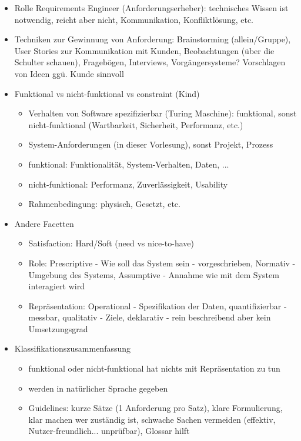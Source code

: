 \documentclass[paper=a4, fontsize=11pt]{scrartcl} %
\numberwithin{equation}{section} %
\numberwithin{figure}{section} %
\numberwithin{table}{section} %
\begin{document}
\begin{itemize}
  \item Rolle Requirements Engineer (Anforderungserheber): technisches Wissen ist notwendig, reicht aber nicht, Kommunikation, Konfliktlösung, etc.
  \item Techniken zur Gewinnung von Anforderung: Brainstorming (allein/Gruppe), User Stories zur Kommunikation mit Kunden, Beobachtungen (über die Schulter schauen), Fragebögen, Interviews, Vorgängersysteme? Vorschlagen von Ideen ggü. Kunde sinnvoll
  \item Funktional vs nicht-funktional vs constraint (Kind)
  \begin{itemize}
    \item Verhalten von Software spezifizierbar (Turing Maschine): funktional, sonst nicht-funktional (Wartbarkeit, Sicherheit, Performanz, etc.)
    \item System-Anforderungen (in dieser Vorlesung), sonst Projekt, Prozess
    \item funktional: Funktionalität, System-Verhalten, Daten, ...
    \item nicht-funktional: Performanz, Zuverlässigkeit, Usability
    \item Rahmenbedingung: physisch, Gesetzt, etc.
  \end{itemize}
  \item Andere Facetten
  \begin{itemize}
    \item Satisfaction: Hard/Soft (need vs nice-to-have)
    \item Role: Prescriptive - Wie soll das System sein - vorgeschrieben, Normativ - Umgebung des Systems, Assumptive - Annahme wie mit dem System interagiert wird
    \item Repräsentation: Operational - Spezifikation der Daten, quantifizierbar - messbar, qualitativ - Ziele, deklarativ - rein beschreibend aber kein Umsetzungsgrad
  \end{itemize}
  \item Klassifikationszusammenfassung
  \begin{itemize}
    \item funktional oder nicht-funktional hat nichts mit Repräsentation zu tun
    \item werden in natürlicher Sprache gegeben
    \item Guidelines: kurze Sätze (1 Anforderung pro Satz), klare Formulierung, klar machen wer zuständig ist, schwache Sachen vermeiden (effektiv, Nutzer-freundlich... unprüfbar), Glossar hilft
  \end{itemize}
\end{itemize}
\end{document}
